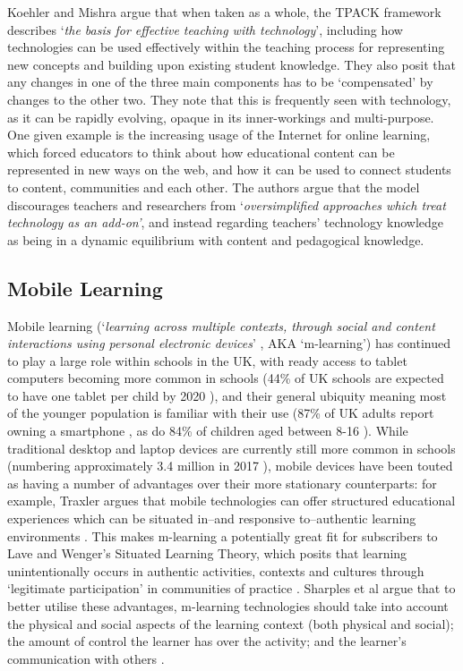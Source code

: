 \documentclass[,hyphens]{sigchi}
\begin{document}
Koehler and Mishra argue that when taken as a whole, the TPACK framework describes `\textit{the basis for effective teaching with technology}', including how technologies can be used effectively within the teaching process for representing new concepts and building upon existing student knowledge. They also posit that any changes in one of the three main components has to be `compensated' by changes to the other two. They note that this is frequently seen with technology, as it can be rapidly evolving, opaque in its inner-workings and multi-purpose. One given example is the increasing usage of the Internet for online learning, which forced educators to think about how educational content can be represented in new ways on the web, and how it can be used to connect students to content, communities and each other.  The authors argue that the model discourages teachers and researchers from `\textit{oversimplified approaches which treat technology as an add-on'}, and instead regarding teachers' technology knowledge as being in a dynamic equilibrium with content and pedagogical knowledge.

\subsection{Mobile Learning}

Mobile learning (`\textit{learning across multiple contexts, through social and content interactions using personal electronic devices}' \cite{Crompton2013}, AKA `m-learning') has continued to play a large role within schools in the UK, with ready access to tablet computers becoming more common in schools (44\% of UK schools are expected to have one tablet per child by 2020 \cite{BritishEducationalSuppliersAssociation2015}), and their general ubiquity meaning most of the younger population is familiar with their use (87\% of UK adults report owning a smartphone \cite{Statistica2018}, as do 84\% of children aged between 8-16 \cite{Statistica2018a}). While traditional desktop and laptop devices are currently still more common in schools (numbering approximately 3.4 million in 2017 \cite{BritishEducationalSuppliersAssociation2017}), mobile devices have been touted as having a number of advantages over their more stationary counterparts: for example, Traxler argues that mobile technologies can offer structured educational experiences which can be situated in--and responsive to--authentic learning environments \cite{Traxler2011}. This makes m-learning a potentially great fit for subscribers to Lave and Wenger's Situated Learning Theory, which posits that learning unintentionally occurs in authentic activities, contexts and cultures through `legitimate participation' in communities of practice \cite{Lave1991}. Sharples et al argue that to better utilise these advantages, m-learning technologies should take into account the physical and social aspects of the learning context (both physical and social); the amount of control the learner has over the activity; and the learner's communication with others \cite{Sharples2007}.
\end{document}
